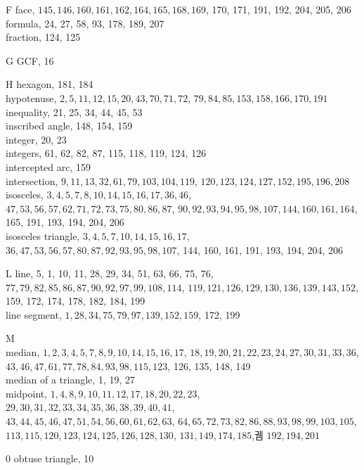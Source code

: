 \documentclass{article}
\begin{document}
F
face, \(145,146,160,161,162,164,165,168,169\), 170, 171, 191, 192, 204, 205, 206\\
formula, 24, 27, 58, 93, 178, 189, 207\\
fraction, 124, 125

G
GCF, 16

H
hexagon, 181, 184\\
hypotenuse, \(2,5,11,12,15,20,43,70,71,72\), \(79,84,85,153,158,166,170,191\)\\
inequality, 21, 25, 34, 44, 45, 53\\
inscribed angle, 148, 154, 159\\
integer, 20, 23\\
integers, 61, 62, 82, 87, 115, 118, 119, 124, 126\\
intercepted arc, 159\\
intersection, \(9,11,13,32,61,79,103,104,119\), \(120,123,124,127,152,195,196,208\)\\
isosceles, \(3,4,5,7,8,10,14,15,16,17,36,46\), \(47,53,56,57,62,71,72,73,75,80,86,87\), \(90,92,93,94,95,98,107,144,160,161,164\), 165, 191, 193, 194, 204, 206\\
isosceles triangle, \(3,4,5,7,10,14,15,16,17\), \(36,47,53,56,57,80,87,92,93,95,98,107\), 144, 160, 161, 191, 193, 194, 204, 206

L
line, 5, 1, 10, 11, 28, 29, 34, 51, 63, 66, 75, 76, \(77,79,82,85,86,87,90,92,97,99,108,114\), \(119,121,126,129,130,136,139,143,152\), 159, 172, 174, 178, 182, 184, 199\\
line segment, \(1,28,34,75,79,97,139,152,159\), 172, 199

M\\
median, \(1,2,3,4,5,7,8,9,10,14,15,16,17\), \(18,19,20,21,22,23,24,27,30,31,33,36\), \(43,46,47,61,77,78,84,93,98,115,123\), 126, 135, 148, 149\\
median of a triangle, 1, 19, 27\\
midpoint, \(1,4,8,9,10,11,12,17,18,20,22,23\), \(29,30,31,32,33,34,35,36,38,39,40,41\),\\
\(43,44,45,46,47,51,54,56,60,61,62,63\), \(64,65,72,73,82,86,88,93,98,99,103,105\), \(113,115,120,123,124,125,126,128,130\), \(131,149,174,185\),궴 \(192,194,201\)

0
obtuse triangle, 10
\end{document}
